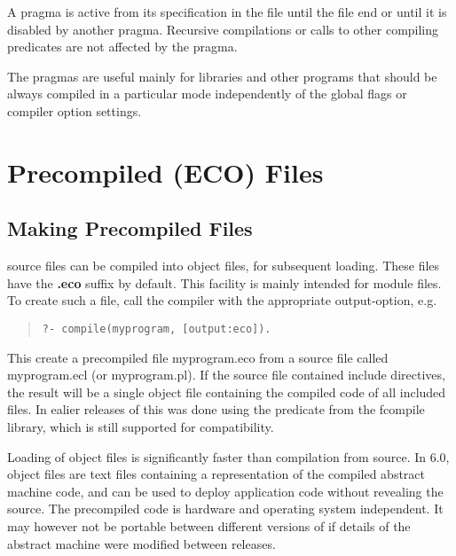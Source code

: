 A pragma is active from its specification in the file
until the file end or until it is disabled by another pragma.
Recursive compilations or calls to other compiling predicates
are not affected by the pragma.

The pragmas are  useful mainly for libraries and other programs
that should be always compiled in a particular mode
independently of the global flags or compiler option settings.


\section{Precompiled (ECO) Files}

\subsection{Making Precompiled Files}
{\eclipse} source files can be compiled into {\eclipse} object files,
for subsequent loading. These files have the {\bf .eco} suffix
by default.
This facility is mainly intended for module files.
To create such a file, call the compiler with the
appropriate output-option, e.g.
\begin{quote}\begin{verbatim}
?- compile(myprogram, [output:eco]).
\end{verbatim}
\end{quote}
This create a precompiled file myprogram.eco from a source file called
myprogram.ecl (or myprogram.pl).  If the source file contained
include directives, the result will be a single object file containing
the compiled code of all included files.
In ealier releases of {\eclipse} this was done using the
predicate from the fcompile library,
which is still supported for compatibility.

Loading of {\eclipse} object files is significantly faster than compilation
from source.  In {\eclipse} 6.0, {\eclipse} object files are text files
containing a representation of the compiled abstract machine code, and
can be used to deploy application code without revealing the source.
The precompiled code is hardware and operating system independent.
It may however not be portable between different versions of {\eclipse}
if details of the abstract machine were modified between releases.

